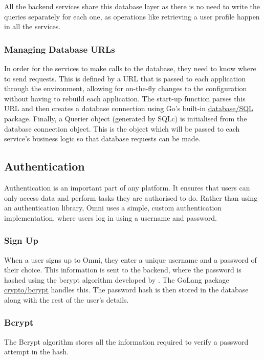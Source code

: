 All the backend services share this database layer as there is no need to write the queries separately for each one, as operations like retrieving a user profile happen in all the services.

\subsubsection{Managing Database URLs}
In order for the services to make calls to the database, they need to know where to send requests.
This is defined by a URL that is passed to each application through the environment, allowing for on-the-fly changes to the configuration without having to rebuild each application. 
The start-up function parses this URL and then creates a database connection using Go's built-in \underline{\href{https://pkg.go.dev/database/sql}{database/SQL}} \nocite{gosqlpkg} package.
Finally, a Querier object (generated by SQLc) is initialised from the database connection object. This is the object which will be passed to each service's business logic so that database requests can be made.

\subsection{Authentication}
Authentication is an important part of any platform. It ensures that users can only access data and perform tasks they are authorised to do. 
Rather than using an authentication library, Omni uses a simple, custom authentication implementation, where users log in using a username and password.

\subsubsection{Sign Up}
\label{sec:impl-auth-signup}
When a user signs up to Omni, they enter a unique username and a password of their choice.
This information is sent to the backend, where the password is hashed using the bcrypt algorithm developed by \citeauthor{provos1999future}.
The GoLang package \underline{\href{https://pkg.go.dev/golang.org/x/crypto/bcrypt}{crypto/bcrypt}} \nocite{gobcryptpkg} handles this. The password hash is then stored in the database along with the rest of the user's details.

\subsubsection{Bcrypt}
The Bcrypt algorithm stores all the information required to verify a password attempt in the hash.

